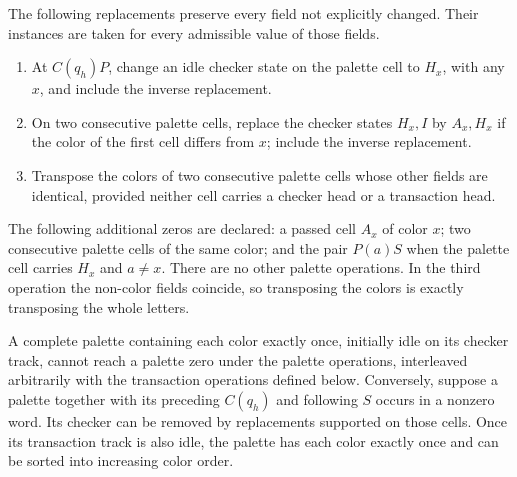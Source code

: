 The following replacements preserve every field not explicitly
changed.  Their instances are taken for every admissible value of
those fields.
\begin{enumerate}
\item At $C(q_h)P$, change an idle checker state on the palette cell
to $H_x$, with any $x$, and include the inverse replacement.
\item On two consecutive palette cells, replace the checker states
$H_x,I$ by $A_x,H_x$ if the color of the first cell differs from $x$;
include the inverse replacement.
\item Transpose the colors of two consecutive palette cells whose
other fields are identical, provided neither cell carries a checker
head or a transaction head.
\end{enumerate}
The following additional zeros are declared: a passed cell $A_x$ of
color $x$; two consecutive palette cells of the same color; and the
pair $P(a)S$ when the palette cell carries $H_x$ and $a\ne x$.
There are no other palette operations.  In the third operation the
non-color fields coincide, so transposing the colors is exactly
transposing the whole letters.

\begin{lemma}\label{fr:palette-soundness}
A complete palette containing each color exactly once, initially
idle on its checker track, cannot reach a palette zero under the
palette operations, interleaved arbitrarily with the transaction
operations defined below. Conversely, suppose a palette together with
its preceding $C(q_h)$ and following $S$ occurs in a nonzero word.
Its checker can be removed by replacements supported on those cells.
Once its transaction track is also idle, the palette has each color
exactly once and can be sorted into increasing color order.
\end{lemma}

